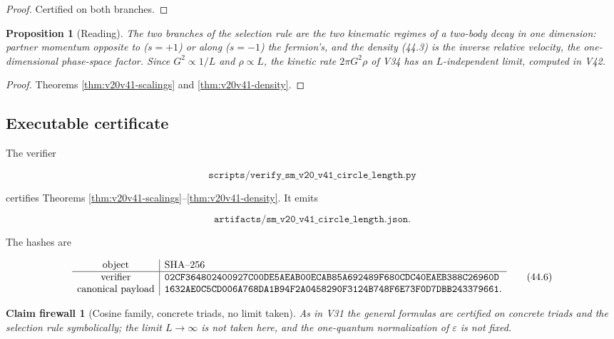 \documentclass[11pt]{article}
\newtheorem{proposition}[theorem]{Proposition}
\newtheorem{firewall}[theorem]{Claim firewall}
\theoremstyle{remark}
\begin{document}
\begin{proof}
Certified on both branches.
\end{proof}

\begin{proposition}[Reading]
\label{prop:v20v41-reading}
The two branches of the selection rule are the two kinematic
regimes of a two-body decay in one dimension: partner momentum
opposite to (\(s=+1\)) or along (\(s=-1\)) the fermion's, and the
density (44.3) is the inverse relative velocity, the one-dimensional
phase-space factor.  Since \(G^2\propto1/L\) and \(\rho\propto L\), the
kinetic rate \(2\pi G^2\rho\) of V34 has an \(L\)-independent limit,
computed in V42.
\end{proposition}

\begin{proof}
Theorems \ref{thm:v20v41-scalings} and \ref{thm:v20v41-density}.
\end{proof}

\subsection{Executable certificate}

The verifier

\[
 \texttt{scripts/verify\_sm\_v20\_v41\_circle\_length.py}             \tag{44.4}
\]

certifies Theorems \ref{thm:v20v41-scalings}--\ref{thm:v20v41-density}.
It emits

\[
 \texttt{artifacts/sm\_v20\_v41\_circle\_length.json}.                \tag{44.5}
\]

The hashes are

\[
\begin{array}{c|l}
\hbox{object}&\hbox{SHA--256}\\ \hline
\hbox{verifier}&
\texttt{02CF364802400927C00DE5AEAB00ECAB85A692489F680CDC40EAEB388C26960D}\\
\hbox{canonical payload}&
\texttt{1632AE0C5CD006A768DA1B94F2A0458290F3124B748F6E73F0D7DBB243379661}.
\end{array}                                                     \tag{44.6}
\]

\begin{firewall}[Cosine family, concrete triads, no limit taken]
\label{fire:v20v41}
As in V31 the general formulas are certified on concrete triads and
the selection rule symbolically; the limit \(L\to\infty\) is not
taken here, and the one-quantum normalization of \(\varepsilon\) is
not fixed.
\end{firewall}
\end{document}
